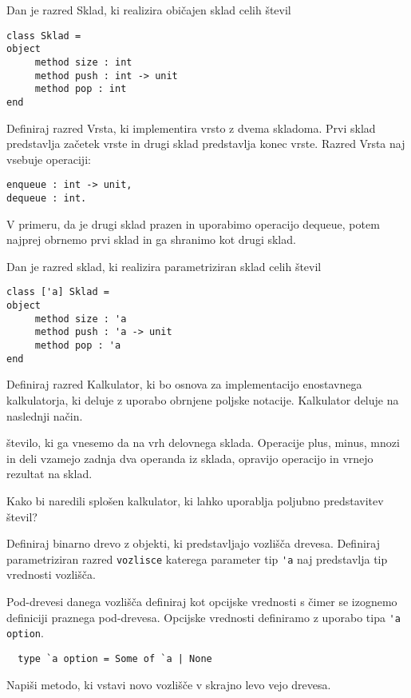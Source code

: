 \begin{ex}
Dan je razred Sklad, ki realizira obi\v cajen sklad celih \v stevil

\begin{lstlisting}
class Sklad =
object 
     method size : int
     method push : int -> unit
     method pop : int
end

\end{lstlisting}
Definiraj razred Vrsta, ki implementira vrsto z dvema skladoma. Prvi sklad predstavlja za\v cetek vrste in drugi sklad predstavlja konec vrste. Razred Vrsta naj vsebuje operaciji: 

\begin{lstlisting}
enqueue : int -> unit, 
dequeue : int. 

\end{lstlisting}
V primeru, da je drugi sklad prazen in uporabimo operacijo dequeue, potem najprej obrnemo prvi sklad in ga shranimo kot drugi sklad.



\end{ex}
\begin{ex}
Dan je razred sklad, ki realizira parametriziran sklad celih \v stevil
\begin{lstlisting}
class ['a] Sklad =
object 
     method size : 'a
     method push : 'a -> unit
     method pop : 'a
end
\end{lstlisting}
Definiraj razred Kalkulator, ki bo osnova za implementacijo enostavnega kalkulatorja, ki deluje z uporabo obrnjene poljske notacije. Kalkulator deluje na naslednji na\v cin.  

\v stevilo, ki ga vnesemo da na vrh delovnega sklada. Operacije plus, minus, mnozi in deli vzamejo zadnja dva operanda iz sklada, opravijo operacijo in vrnejo rezultat na sklad. 

Kako bi naredili splo\v sen kalkulator, ki lahko uporablja poljubno predstavitev \v stevil?


\end{ex} 
\begin{ex}
  Definiraj binarno drevo z objekti, ki predstavljajo vozli\v s\v
  ca drevesa. Definiraj parametriziran razred \lstinline{vozlisce}
  katerega parameter tip \lstinline{'a} naj predstavlja tip vrednosti
  vozli\v s\v ca.

  Pod-drevesi danega vozli\v s\v ca definiraj kot opcijske vrednosti s
  \v cimer se izognemo definiciji praznega pod-drevesa. Opcijske
  vrednosti definiramo z uporabo tipa \lstinline{'a option}.

\begin{lstlisting}
  type `a option = Some of `a | None
\end{lstlisting}

  Napi\v si metodo, ki vstavi novo vozli\v s\v ce v skrajno levo vejo
  drevesa.

 
\end{ex} 
